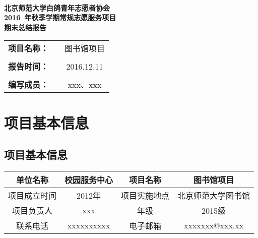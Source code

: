\documentclass[nocover]{lizhechen}
\begin{document}
	
	\begin{center}
		\ 
		\\[20ex]
		{\heiti\huge \textbf{北京师范大学白鸽青年志愿者协会}}\\[3ex]
		{\heiti\huge \textbf{2016~年秋季学期常规志愿服务项目}}\\[3ex]
		{\heiti\huge \textbf{期末总结报告}}
		\\[70ex]
		\begin{table}[H]
			\begin{center}
				\begin{tabular}{ccc}
					{\Large \textbf{项目名称：}} & & {\Large 图书馆项目} \\
					 &  & \\
					{\Large \textbf{报告时间：}} & & {\Large 2016.12.11} \\
					 &  & \\
					{\Large \textbf{编写成员：}} & & {\Large xxx、xxx} \\
				\end{tabular}
			\end{center}
		\end{table}
	\end{center}
	
	\section{项目基本信息}
	\subsection{项目基本信息}
	
	\begin{table}[H]
		\begin{center}
		\begin{tabular}{|c|c|c|c|}
			\hline
			单位名称 & 校园服务中心 & 项目名称 &  图书馆项目 \\
			\hline
			项目成立时间 & 2012年 & 项目实施地点 & 北京师范大学图书馆 \\
			\hline
			项目负责人 & xxx & 年级 & 2015级 \\
			\hline
			联系电话 & xxxxxxxxxx & 电子邮箱 & xxxxxxx@xxx.xx \\
			\hline
		\end{tabular}
		\end{center}
	\end{table}
	
\end{document}
